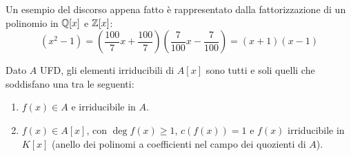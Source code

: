 \documentclass[11pt]{scrartcl}
\begin{document}
\begin{example}
    Un esempio del discorso appena fatto è rappresentato dalla fattorizzazione di un polinomio in $\mathbb Q[x]$ e $\mathbb Z[x]$:
    \[ (x^2 - 1) = \left(\frac{100}{7}x+\frac{100}{7}\right)\left(\frac{7}{100}x - \frac{7}{100}\right) = (x + 1)(x - 1)
        \]
\end{example}

\begin{theorem}
    \label{carattirr}
    Dato $A$ UFD, gli elementi irriducibili di $A[x]$ sono tutti e soli quelli che soddisfano una tra le seguenti:
    \begin{enumerate}[(1)]
        \item $f(x) \in A$ e irriducibile in $A$.
        \item $f(x) \in A[x]$, con $\deg f(x) \geq 1$, $c(f(x)) = 1$ e $f(x)$ irriducibile in $K[x]$ (anello dei polinomi a coefficienti nel campo dei quozienti di $A$).
    \end{enumerate}
\end{theorem}
\end{document}
